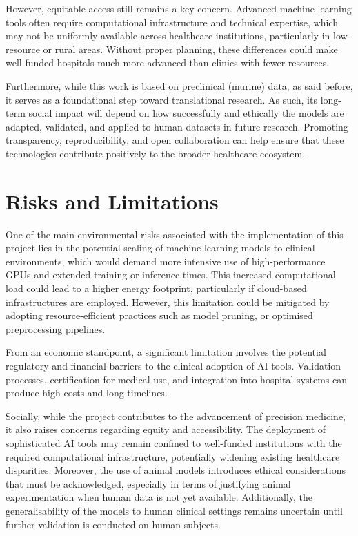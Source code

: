 \documentclass[12pt, a4paper]{report}
\begin{document}
However, equitable access still remains a key concern. Advanced machine learning tools often require computational infrastructure and technical expertise, which may not be uniformly available across healthcare institutions, particularly in low-resource or rural areas. Without proper planning, these differences could make well-funded hospitals much more advanced than clinics with fewer resources.

Furthermore, while this work is based on preclinical (murine) data, as said before, it serves as a foundational step toward translational research. As such, its long-term social impact will depend on how successfully and ethically the models are adapted, validated, and applied to human datasets in future research. Promoting transparency, reproducibility, and open collaboration can help ensure that these technologies contribute positively to the broader healthcare ecosystem.

\section{Risks and Limitations}

One of the main environmental risks associated with the implementation of this project lies in the potential scaling of machine learning models to clinical environments, which would demand more intensive use of high-performance GPUs and extended training or inference times. This increased computational load could lead to a higher energy footprint, particularly if cloud-based infrastructures are employed. However, this limitation could be mitigated by adopting resource-efficient practices such as model pruning, or optimised preprocessing pipelines.

From an economic standpoint, a significant limitation involves the potential regulatory and financial barriers to the clinical adoption of AI tools. Validation processes, certification for medical use, and integration into hospital systems can produce high costs and long timelines.

Socially, while the project contributes to the advancement of precision medicine, it also raises concerns regarding equity and accessibility. The deployment of sophisticated AI tools may remain confined to well-funded institutions with the required computational infrastructure, potentially widening existing healthcare disparities. Moreover, the use of animal models introduces ethical considerations that must be acknowledged, especially in terms of justifying animal experimentation when human data is not yet available. Additionally, the generalisability of the models to human clinical settings remains uncertain until further validation is conducted on human subjects.
\end{document}
